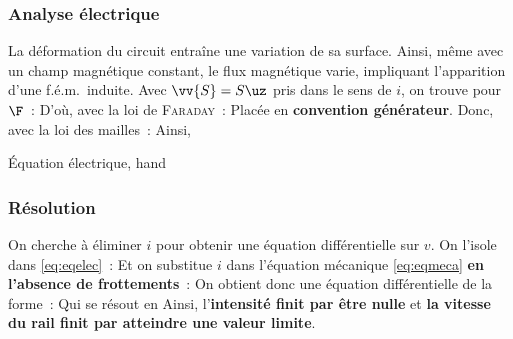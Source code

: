 \documentclass[../main/main.tex]{subfiles}
\begin{document}
\subsubsection{Analyse électrique}
\label{sssec:rlplmot_anaelec}
La déformation du circuit entraîne une variation de sa surface. Ainsi, même avec
un champ magnétique constant, le flux magnétique varie, impliquant l'apparition
d'une f.é.m.\ induite.
\bigbreak
\noindent
Avec $\vv{S} = S\uz$ pris dans le sens de $i$, on trouve pour $\F$~:
D'où, avec la loi de \textsc{Faraday}~:
Placée en \textbf{convention générateur}. Donc, avec la loi des mailles~:
Ainsi,
\begin{tprop}{Équation électrique, hand}
\end{tprop}

\subsubsection{Résolution}
\label{sssec:rlplmot_resol}
On cherche à éliminer $i$ pour obtenir une équation différentielle sur $v$. On
l'isole dans \eqref{eq:eqelec}~:
Et on substitue $i$ dans l'équation mécanique \eqref{eq:eqmeca} \textbf{en
l'absence de frottements}~:
On obtient donc une équation différentielle de la forme~:
Qui se résout en
Ainsi, l'\textbf{intensité finit par être nulle} et \textbf{la vitesse du rail
finit par atteindre une valeur limite}.
\end{document}
